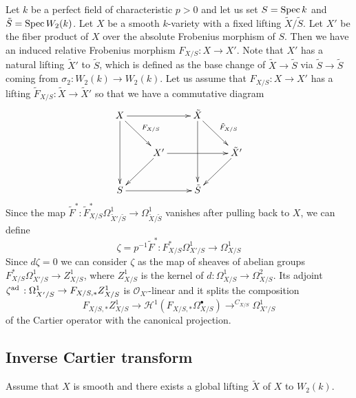 \documentclass[12pt]{article}
\theoremstyle{plain}
\theoremstyle{definition}
\theoremstyle{remark}
\newcommand{\cH}{{\mathcal H}}
\newcommand{\cO}{{\mathcal O}}
\newcommand{\ad}{{\mathop{\rm ad \, }}}
\newcommand{\Spec}{{\mathop{{\rm Spec\, }}}}
\begin{document}
Let $k$ be a perfect field of characteristic $p>0$ and let us set $S=\Spec k$ and $\tilde S=\Spec W_2(k)$.
Let $X$ be a smooth $k$-variety with a fixed lifting $\tilde X/ \tilde S$.
Let $X'$ be the fiber product of $X$ over the absolute Frobenius morphism of $S$. Then we have an induced relative Frobenius morphism $F_{X/S}:X\to X'$. Note that $X'$ has a natural lifting $\tilde X'$ to $\tilde S$, which is defined
as the base change of $\tilde X\to \tilde S$ via $\tilde S\to \tilde S$ coming from $\sigma _2: W_2(k)\to W_2(k)$.
Let us assume that $F_{X/S}: X\to X'$ has a lifting $\tilde F_{X/S}: \tilde X\to \tilde X'$ so that we have a commutative diagram
$$\xymatrix{ 
	X\ar[rr]\ar[dd]\ar[rd]^{F_{X/S}}& &\tilde X\ar[dd] \ar[rd]^{\tilde F_{X/S}}&\\
	&X'\ar[rr]\ar[ld]&&\tilde X'\ar[ld]\\
	S\ar[rr]&&\tilde S&\\
}$$ 
Since the map
$\tilde F^*: \tilde F^*_{X/S}\Omega_{\tilde X'/\tilde S}^1\to \Omega_{\tilde X/\tilde S}^1$
vanishes after pulling back to $X$, we can define 
$$\zeta=p^{-1}\tilde F^*: F^*_{X/S}\Omega_{X'/S}^1\to \Omega_{X/S}^1$$
Since $d\zeta=0$ we can consider $\zeta$ as the map of sheaves of abelian groups $F^*_{X/S}\Omega_{X'/S}^1\to Z_{X/S}^1$, where $Z^1_{X/S}$ is the kernel of $d: \Omega ^1_{X/S}\to \Omega ^2_{X/S}$.
Its adjoint 
$\zeta^{\ad}: \Omega_{X'/S}^1\to F_{X/S, *} Z_{X/S}^1$
is $\cO_{X'}$-linear and it splits the composition  
$$ F_{X/S, *} Z_{X/S}^1\longrightarrow \cH^1 (F_{X/S, *}\Omega _{X/S}^{\bullet})\mathop{\longrightarrow}^{C_{X/S}} \Omega_{X'/S}^1$$
of the Cartier operator with the canonical projection.

\subsection{Inverse Cartier transform}

Assume that $X$ is smooth and there exists a global lifting $\tilde X$ of $X$ to $W_2(k)$.
\end{document}
